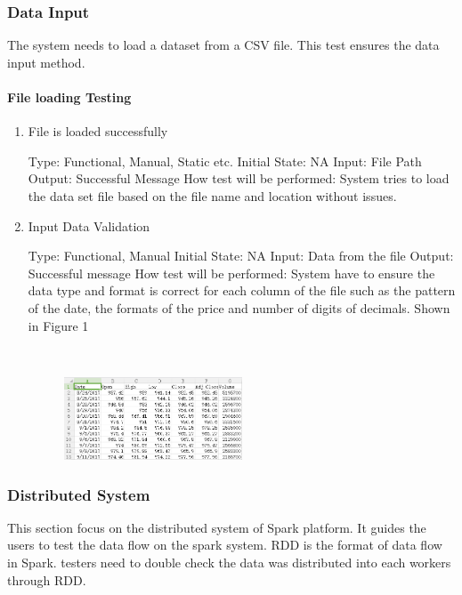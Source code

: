 \documentclass[12pt, titlepage]{article}
\begin{document}
\subsubsection{Data Input}
The system needs to load a dataset from a CSV file. This test ensures the data input method. 
\paragraph{File loading Testing }

\begin{enumerate}

\item{File is loaded successfully\\}

Type: Functional, Manual, Static etc.
Initial State: NA
Input: File Path
Output: Successful Message
How test will be performed: System tries to load the data set file based on the file name and location without issues.
\item{Input Data Validation\\}

Type: Functional, Manual
Initial State: NA
Input: Data from the file
Output: Successful message
How test will be performed: System have to ensure the data type and format is correct for each column of the file such as the pattern of the date, the formats of the price and number of digits of decimals. Shown in Figure 1

~\newline
\begin{figure}[h!]
\begin{center}
{
\includegraphics[width=0.5\textwidth]{amazon.png}
}
\caption{\label{Input Data}}
\end{center}
\end{figure}

\end{enumerate}

\subsubsection{Distributed System}
This section focus on the distributed system of Spark platform. It guides the users to test the data flow on the spark system. RDD is the format of data flow in Spark. testers need to double check the data was distributed into each workers through RDD.
\end{document}
